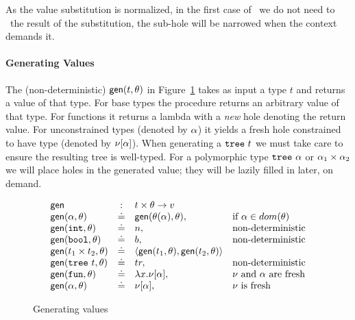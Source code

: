 %
As the value substitution is normalized, in the first case of \forcesym\ we
do not need to \forcesym\ the result of the substitution, the sub-hole
will be narrowed when the context demands it.

\paragraph{Generating Values} The (non-deterministic)
$\mathsf{gen}(t,\theta)$ in Figure~\ref{fig:gen} takes
as input a type $t$ and returns a value of that type.
%
For base types the procedure returns an arbitrary value of
that type.
%
For functions it returns a lambda with a \emph{new} hole
denoting the return value.
%
For unconstrained types (denoted
by $\alpha$) it yields a fresh hole constrained to have type
\thole (denoted by $\nu[\alpha]$).
%
When generating a $\mathtt{tree}\ t$ we must take care to ensure
the resulting tree is well-typed.
%
For a polymorphic type $\mathtt{tree}\ \alpha$ %
or $\alpha_1 \times \alpha_2$
we will place holes in the generated value; they will be lazily filled
in later, on demand.


\begin{figure}[ht]
$$
\begin{array}{lcll}
\gensym       & :   & t \times \tsu \rightarrow v \\
\gen{\thole}{\tsu}  & \defeq  & \gen{\subst{\tsu}{\thole}}{\tsu}, &  \text{if } \thole \in dom(\tsu) \\
\gen{\tint}{\tsu}   & \defeq  & n, &  \text{non-deterministic} \\
\gen{\tbool}{\tsu}  & \defeq  & b, &  \text{non-deterministic} \\
\gen{\tprod{t_1}{t_2}}{\tsu}  & \defeq  & \epair{\gen{t_1}{\tsu}}{\gen{t_2}{\tsu}} & \\ %
\gen{\ttree{t}}{\tsu}  & \defeq  & tr, &  \text{non-deterministic} \\
\gen{\tfun}{\tsu}   & \defeq & \efun{x}{\vhole{\thole}}, &  \text{\ehole and \thole are fresh} \\
\gen{\thole}{\tsu}  & \defeq & \vhole{\thole}, & \text{\ehole is fresh} \\
\end{array}
$$
\caption{Generating values}
\label{fig:gen}
\end{figure}


